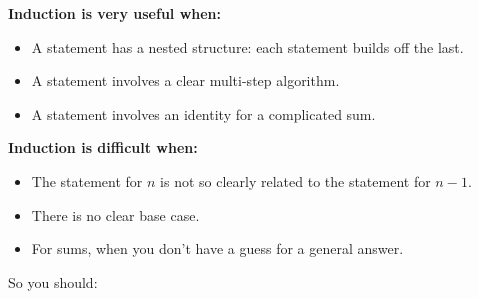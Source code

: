 \documentclass[11pt,dvipsnames]{book}
\numberwithin{equation}{section} %
\numberwithin{figure}{section} %
\numberwithin{table}{section} %
\begin{document}
\begin{multicols}{2}
{\bf  Induction is very useful when:}

\begin{itemize}
\item A statement has a nested structure: each statement builds off the last.
\item A statement involves a clear multi-step algorithm.
\item A statement involves an identity for a complicated sum.
\end{itemize}

{\bf Induction is difficult when:}

\begin{itemize}
\item The statement for $n$ is not so clearly related to the statement for $n-1$.
\item There is no clear base case.
\item For sums, when you don't have a guess for a general answer.
\end{itemize}
\end{multicols}

So you should:





% 
% 
%
%
%
%
\end{document}
